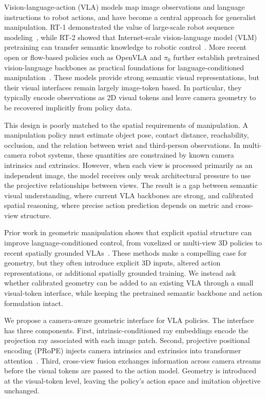 \documentclass{article}
\begin{document}
Vision-language-action (VLA) models map image observations and language instructions to robot actions, and have become a central approach for generalist manipulation. RT-1 demonstrated the value of large-scale robot sequence modeling~\citep{brohan2023rt1}, while RT-2 showed that Internet-scale vision-language model (VLM) pretraining can transfer semantic knowledge to robotic control~\citep{zitkovich2023rt2}. More recent open or flow-based policies such as OpenVLA and $\pi_0$ further establish pretrained vision-language backbones as practical foundations for language-conditioned manipulation~\citep{kim2024openvla,black2025pi0}. These models provide strong semantic visual representations, but their visual interfaces remain largely image-token based. In particular, they typically encode observations as 2D visual tokens and leave camera geometry to be recovered implicitly from policy data.

This design is poorly matched to the spatial requirements of manipulation. A manipulation policy must estimate object pose, contact distance, reachability, occlusion, and the relation between wrist and third-person observations. In multi-camera robot systems, these quantities are constrained by known camera intrinsics and extrinsics. However, when each view is processed primarily as an independent image, the model receives only weak architectural pressure to use the projective relationships between views. The result is a gap between semantic visual understanding, where current VLA backbones are strong, and calibrated spatial reasoning, where precise action prediction depends on metric and cross-view structure.

Prior work in geometric manipulation shows that explicit spatial structure can improve language-conditioned control, from voxelized or multi-view 3D policies to recent spatially grounded VLAs~\citep{shridhar2023peract,goyal2023rvt,zhen2024threedvla,qu2025spatialvla}. These methods make a compelling case for geometry, but they often introduce explicit 3D inputs, altered action representations, or additional spatially grounded training. We instead ask whether calibrated geometry can be added to an existing VLA through a small visual-token interface, while keeping the pretrained semantic backbone and action formulation intact.

We propose a camera-aware geometric interface for VLA policies. The interface has three components. First, intrinsic-conditioned ray embeddings encode the projection ray associated with each image patch. Second, projective positional encoding (PRoPE) injects camera intrinsics and extrinsics into transformer attention~\citep{li2025cameras}. Third, cross-view fusion exchanges information across camera streams before the visual tokens are passed to the action model. Geometry is introduced at the visual-token level, leaving the policy's action space and imitation objective unchanged.
\end{document}
